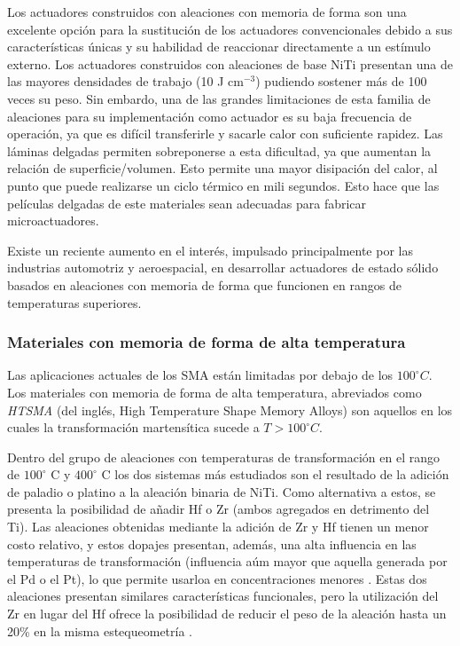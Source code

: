 \documentclass[12pt]{article}
\theoremstyle{definition}
\theoremstyle{remark}
\begin{document}
Los actuadores construidos con aleaciones con memoria de forma son una excelente opción para la sustitución de los actuadores convencionales debido a sus características únicas y su habilidad de reaccionar directamente a un estímulo externo. Los actuadores construidos con aleaciones de base NiTi presentan una de las mayores densidades de trabajo (10 J cm$^{-3}$) pudiendo sostener más de 100 veces su peso. Sin embardo, una de las grandes limitaciones de esta familia de aleaciones para su implementación como actuador es su baja frecuencia de operación, ya que es difícil transferirle y sacarle calor con suficiente rapidez. Las láminas delgadas permiten sobreponerse a esta dificultad, ya que aumentan la relación de superficie/volumen. Esto permite una mayor disipación del calor, al punto que puede realizarse un ciclo térmico en mili segundos. Esto hace que las películas delgadas de este materiales sean adecuadas para fabricar microactuadores\cite{ThinFilm}.

Existe un reciente aumento en el interés, impulsado principalmente por las industrias automotriz y aeroespacial, en desarrollar actuadores de estado sólido basados en aleaciones con memoria de forma que funcionen en rangos de temperaturas superiores.

\subsubsection{Materiales con memoria de forma de alta temperatura}

Las aplicaciones actuales de los SMA están limitadas por debajo de los $100^\circ C$. Los materiales con memoria de forma de alta temperatura, abreviados como \textit{HTSMA} (del inglés, High Temperature Shape Memory Alloys) son aquellos en los cuales la transformación martensítica sucede a $T > 100^\circ C$.

Dentro del grupo de aleaciones con temperaturas de transformación en el rango de $100^\circ$ C y $400^\circ$ C los dos sistemas más estudiados son el resultado de la adición de paladio o platino a la aleación binaria de NiTi. Como alternativa a estos, se presenta la posibilidad de añadir Hf o Zr (ambos agregados en detrimento del Ti)\cite{HTSMA}. Las aleaciones obtenidas mediante la adición de Zr y Hf tienen un menor costo relativo, y estos dopajes presentan, además, una alta influencia en las temperaturas de transformación (influencia aúm mayor que aquella generada por el Pd o el Pt), lo que permite usarloa en concentraciones menores \cite{HTSMA}. Estas dos aleaciones presentan similares características funcionales, pero la utilización del Zr en lugar del Hf ofrece la posibilidad de reducir el peso de la aleación hasta un 20\% en la misma estequeometría \cite{Evirgen2013}.
\end{document}
